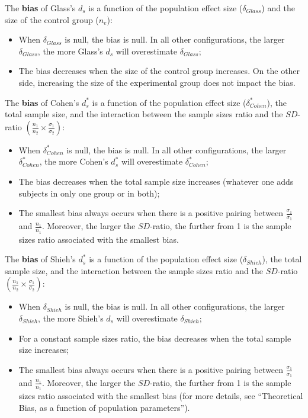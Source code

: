 \documentclass[
  english,
  man]{apa6}
\providecommand{\tightlist}{%
  \setlength{\itemsep}{0pt}\setlength{\parskip}{0pt}}
\begin{document}
The \textbf{bias} of Glass's \(d_s\) is a function of the population effect size (\(\delta_{Glass}\)) and the size of the control group (\(n_e\)):

\begin{itemize}
\tightlist
\item
  When \(\delta_{Glass}\) is null, the bias is null. In all other configurations, the larger \(\delta_{Glass}\), the more Glass's \(d_s\) will overestimate \(\delta_{Glass}\);\\
\item
  The bias decreases when the size of the control group increases. On the other side, increasing the size of the experimental group does not impact the bias.
\end{itemize}

The \textbf{bias} of Cohen's \(d^*_s\) is a function of the population effect size (\(\delta^*_{Cohen}\)), the total sample size, and the interaction between the sample sizes ratio and the \(SD\)-ratio \(\left(\frac{n_1}{n_2}\times\frac{\sigma_1}{\sigma_2} \right)\):

\begin{itemize}
\tightlist
\item
  When \(\delta^*_{Cohen}\) is null, the bias is null. In all other configurations, the larger \(\delta^*_{Cohen}\), the more Cohen's \(d^*_s\) will overestimate \(\delta^*_{Cohen}\);\\
\item
  The bias decreases when the total sample size increases (whatever one adds subjects in only one group or in both);\\
\item
  The smallest bias always occurs when there is a positive pairing between \(\frac{\sigma_1}{\sigma_1}\) and \(\frac{n_1}{n_1}\). Moreover, the larger the \(SD\)-ratio, the further from 1 is the sample sizes ratio associated with the smallest bias.
\end{itemize}

The \textbf{bias} of Shieh's \(d^*_s\) is a function of the population effect size (\(\delta_{Shieh}\)), the total sample size, and the interaction between the sample sizes ratio and the \(SD\)-ratio \(\left(\frac{n_1}{n_2}\times\frac{\sigma_1}{\sigma_2} \right)\):

\begin{itemize}
\tightlist
\item
  When \(\delta_{Shieh}\) is null, the bias is null. In all other configurations, the larger \(\delta_{Shieh}\), the more Shieh's \(d_s\) will overestimate \(\delta_{Shieh}\);\\
\item
  For a constant sample sizes ratio, the bias decreases when the total sample size increases;\\
\item
  The smallest bias always occurs when there is a positive pairing between \(\frac{\sigma_1}{\sigma_1}\) and \(\frac{n_1}{n_1}\). Moreover, the larger the \(SD\)-ratio, the further from 1 is the sample sizes ratio associated with the smallest bias (for more details, see \enquote{Theoretical Bias, as a function of population parameters}).
\end{itemize}
\end{document}
